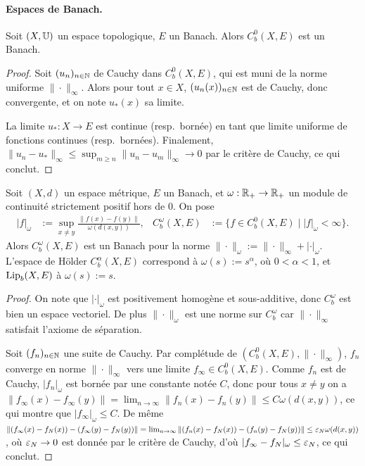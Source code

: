 \paragraph{Espaces de Banach.}

\begin{exemple}
\label{ex:cont_bornee_Banach}
%
	Soit $(X,\mathbb{U})$ un espace topologique, $E$ un Banach. Alors $C^0_b(X,E)$ est un Banach.
\end{exemple}

\begin{proof}
	Soit $(u_n)_{n \in \mathbb{N}}$ de Cauchy dans $C^0_b(X,E)$, qui est muni de la norme uniforme $\|\cdot\|_\infty$. Alors pour tout $x \in X$, $(u_n(x))_{n \in \mathbb{N}}$ est de Cauchy, donc convergente, et on note $u_*(x)$ sa limite. 
	
	La limite $u_* : X\to E$ est continue (resp.\ bornée) en tant que limite uniforme de fonctions continues (resp.\ bornées). Finalement, $\|u_n - u_*\|_\infty \leq \sup_{m \geq n} \|u_n-u_m\|_\infty \to 0$ par le critère de Cauchy, ce qui conclut.  
\end{proof}

\begin{exemple}
\label{ex:Holder_Banach}
%
	Soit $(X,d)$ un espace métrique, $E$ un Banach, et $\omega : \mathbb{R}_+ \to \mathbb{R}_+$ un module de continuité strictement positif hors de $0$. 
	On pose 
	\begin{align}
		|f|_\omega &:= \sup_{x\neq y} \frac{\|f(x)-f(y)\|}{\omega(d(x,y))},&
		C_b^\omega(X,E) &:= \{f \in C^0_b(X,E) \mid |f|_\omega < \infty\}. 
	\end{align}
	Alors $C^\omega_b(X,E)$ est un Banach pour la norme $\|\cdot\|_\omega := \|\cdot\|_\infty + |\cdot|_\omega$. 
	L'espace de Hölder $C^\alpha_b(X,E)$ correspond à $\omega(s):=s^\alpha$, où $0 < \alpha < 1$, et $\operatorname{Lip}_b(X,E)$ à $\omega(s):=s$.
\end{exemple} 

\begin{proof}
	On note que $|\cdot|_\omega$ est positivement homogène et sous-additive, donc $C_b^\omega$ est bien un espace vectoriel. De plus $\|\cdot\|_\omega$ est une norme sur $C^\omega_b$ car $\|\cdot\|_\infty$ satisfait l'axiome de séparation. 
	
	Soit $(f_n)_{n \in \mathbb{N}}$ une suite de Cauchy. Par complétude de $(C^0_b(X,E),\|\cdot\|_\infty)$, $f_n$ converge en norme $\|\cdot\|_\infty$ vers une limite $f_\infty \in C^0_b(X,E)$.
	Comme $f_n$ est de Cauchy, $|f_n|_\omega$ est bornée par une constante notée $C$, donc pour tous $x \neq y$ on a $\|f_\infty(x)-f_\infty(y)\| = \lim_{n\to \infty} \|f_n(x)-f_n(y)\| \leq C \omega(d(x,y))$, ce qui montre que $|f_\infty|_\omega \leq C$. 
	De même $\| (f_\infty(x)-f_N(x)) - (f_\infty(y)-f_N(y))\| = \lim_{n \to \infty} \| (f_n(x)-f_N(x)) - (f_n(y)-f_N(y))\| \leq \varepsilon_N \omega(d(x,y))$, où $\varepsilon_N\to 0$ est donnée par le critère de Cauchy, d'où $|f_\infty-f_N|_\omega \leq \varepsilon_N$, ce qui conclut.
\end{proof}


